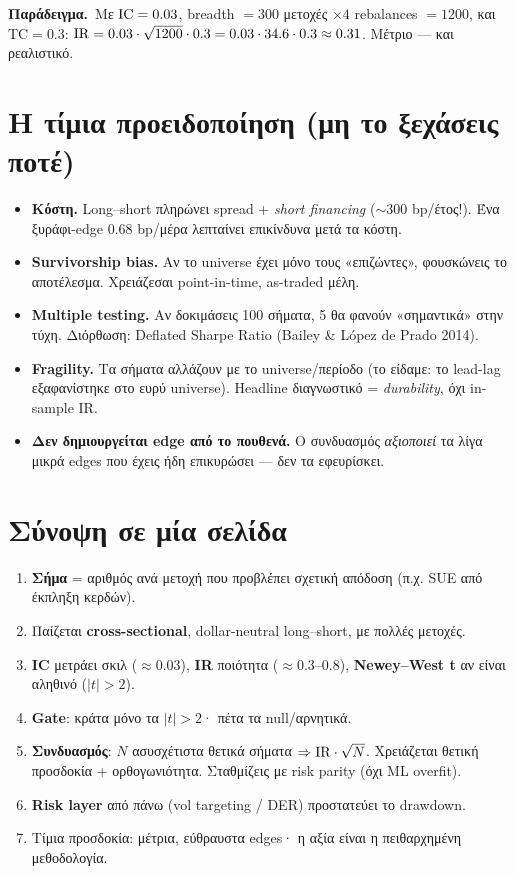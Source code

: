 \documentclass[11pt]{article}
\newcommand{\ex}[1]{\par\smallskip\noindent\textbf{\textcolor{accent}{Παράδειγμα.}}\ #1\par\smallskip}
\begin{document}
\ex{Με $\mathrm{IC}=0.03$, breadth $=300$ μετοχές $\times 4$ rebalances $=1200$, και $\text{TC}=0.3$:
$\mathrm{IR}=0.03\cdot\sqrt{1200}\cdot 0.3=0.03\cdot 34.6\cdot 0.3\approx 0.31$. Μέτριο --- και ρεαλιστικό.}

\section{Η τίμια προειδοποίηση (μη το ξεχάσεις ποτέ)}

\begin{itemize}[leftmargin=1.4em]
\item \textbf{Κόστη.} Long--short πληρώνει spread + \emph{short financing} ($\sim 300$ bp/έτος!).
Ένα ξυράφι-edge $0.68$ bp/μέρα λεπταίνει επικίνδυνα μετά τα κόστη.
\item \textbf{Survivorship bias.} Αν το universe έχει μόνο τους «επιζώντες», φουσκώνεις το αποτέλεσμα.
Χρειάζεσαι point-in-time, as-traded μέλη.
\item \textbf{Multiple testing.} Αν δοκιμάσεις 100 σήματα, 5 θα φανούν «σημαντικά» στην τύχη. Διόρθωση:
Deflated Sharpe Ratio (Bailey \& López de Prado 2014).
\item \textbf{Fragility.} Τα σήματα αλλάζουν με το universe/περίοδο (το είδαμε: το lead-lag εξαφανίστηκε
στο ευρύ universe). Headline διαγνωστικό = \emph{durability}, όχι in-sample IR.
\item \textbf{Δεν δημιουργείται edge από το πουθενά.} Ο συνδυασμός \emph{αξιοποιεί} τα λίγα μικρά edges
που έχεις ήδη επικυρώσει --- δεν τα εφευρίσκει.
\end{itemize}

\section{Σύνοψη σε μία σελίδα}
\begin{enumerate}[leftmargin=1.4em]
\item \textbf{Σήμα} = αριθμός ανά μετοχή που προβλέπει σχετική απόδοση (π.χ. SUE από έκπληξη κερδών).
\item Παίζεται \textbf{cross-sectional}, dollar-neutral long--short, με πολλές μετοχές.
\item \textbf{IC} μετράει σκιλ ($\approx 0.03$), \textbf{IR} ποιότητα ($\approx 0.3$--$0.8$),
\textbf{Newey--West t} αν είναι αληθινό ($|t|>2$).
\item \textbf{Gate}: κράτα μόνο τα $|t|>2$· πέτα τα null/αρνητικά.
\item \textbf{Συνδυασμός}: $N$ ασυσχέτιστα θετικά σήματα $\Rightarrow \mathrm{IR}\cdot\sqrt{N}$. Χρειάζεται
θετική προσδοκία + ορθογωνιότητα. Σταθμίζεις με risk parity (όχι ML overfit).
\item \textbf{Risk layer} από πάνω (vol targeting / DER) προστατεύει το drawdown.
\item Τίμια προσδοκία: μέτρια, εύθραυστα edges· η αξία είναι η πειθαρχημένη μεθοδολογία.
\end{enumerate}
\end{document}
